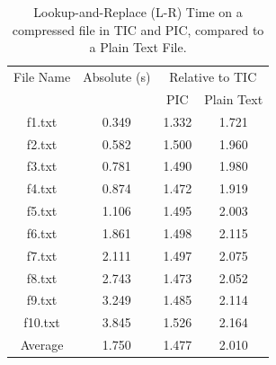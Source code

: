 \begin{table}[ht]
\centering
\begin{tabular}{cccc}
\hline
File Name & Absolute (s) & \multicolumn{2}{c}{Relative to TIC} \\
 &  & PIC & Plain Text \\
\hline
f1.txt & 0.349 & 1.332 & 1.721 \\
f2.txt & 0.582 & 1.500 & 1.960 \\
f3.txt & 0.781 & 1.490 & 1.980 \\
f4.txt & 0.874 & 1.472 & 1.919 \\
f5.txt & 1.106 & 1.495 & 2.003 \\
f6.txt & 1.861 & 1.498 & 2.115 \\
f7.txt & 2.111 & 1.497 & 2.075 \\
f8.txt & 2.743 & 1.473 & 2.052 \\
f9.txt & 3.249 & 1.485 & 2.114 \\
f10.txt & 3.845 & 1.526 & 2.164 \\
Average & 1.750 & 1.477 & 2.010 \\
\hline
\end{tabular}
\caption{Lookup-and-Replace (L-R) Time on a compressed file in TIC and PIC, compared to a Plain Text File.}
\label{tab:lookup_replace_vs_plaintext}
\end{table}
